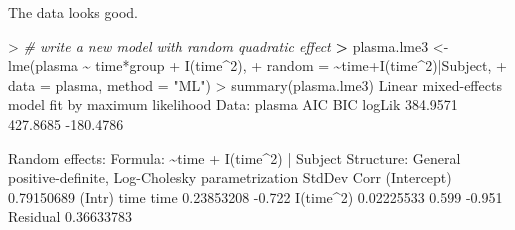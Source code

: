 \documentclass[
]{article}
\newenvironment{Shaded}{\begin{snugshade}}{\end{snugshade}}
\newcommand{\AttributeTok}[1]{\textcolor[rgb]{0.77,0.63,0.00}{#1}}
\newcommand{\CommentTok}[1]{\textcolor[rgb]{0.56,0.35,0.01}{\textit{#1}}}
\newcommand{\DecValTok}[1]{\textcolor[rgb]{0.00,0.00,0.81}{#1}}
\newcommand{\ErrorTok}[1]{\textcolor[rgb]{0.64,0.00,0.00}{\textbf{#1}}}
\newcommand{\FloatTok}[1]{\textcolor[rgb]{0.00,0.00,0.81}{#1}}
\newcommand{\FunctionTok}[1]{\textcolor[rgb]{0.00,0.00,0.00}{#1}}
\newcommand{\NormalTok}[1]{#1}
\newcommand{\OtherTok}[1]{\textcolor[rgb]{0.56,0.35,0.01}{#1}}
\newcommand{\SpecialCharTok}[1]{\textcolor[rgb]{0.00,0.00,0.00}{#1}}
\newcommand{\StringTok}[1]{\textcolor[rgb]{0.31,0.60,0.02}{#1}}
\begin{document}
The data looks good.

\begin{Shaded}
\begin{Highlighting}[]
\SpecialCharTok{\textgreater{}} \CommentTok{\# write a new model with random quadratic effect}
\ErrorTok{\textgreater{}}\NormalTok{ plasma.lme3 }\OtherTok{\textless{}{-}} \FunctionTok{lme}\NormalTok{(plasma }\SpecialCharTok{\textasciitilde{}}\NormalTok{ time}\SpecialCharTok{*}\NormalTok{group }\SpecialCharTok{+} \FunctionTok{I}\NormalTok{(time}\SpecialCharTok{\^{}}\DecValTok{2}\NormalTok{),}
\SpecialCharTok{+}                    \AttributeTok{random =} \SpecialCharTok{\textasciitilde{}}\NormalTok{time}\SpecialCharTok{+}\FunctionTok{I}\NormalTok{(time}\SpecialCharTok{\^{}}\DecValTok{2}\NormalTok{)}\SpecialCharTok{|}\NormalTok{Subject,}
\SpecialCharTok{+}                    \AttributeTok{data =}\NormalTok{ plasma, }\AttributeTok{method =} \StringTok{"ML"}\NormalTok{)}
\SpecialCharTok{\textgreater{}} \FunctionTok{summary}\NormalTok{(plasma.lme3)}
\NormalTok{Linear mixed}\SpecialCharTok{{-}}\NormalTok{effects model fit by maximum likelihood}
\NormalTok{  Data}\SpecialCharTok{:}\NormalTok{ plasma }
\NormalTok{       AIC      BIC    logLik}
  \FloatTok{384.9571} \FloatTok{427.8685} \SpecialCharTok{{-}}\FloatTok{180.4786}

\NormalTok{Random effects}\SpecialCharTok{:}
\NormalTok{ Formula}\SpecialCharTok{:} \ErrorTok{\textasciitilde{}}\NormalTok{time }\SpecialCharTok{+} \FunctionTok{I}\NormalTok{(time}\SpecialCharTok{\^{}}\DecValTok{2}\NormalTok{) }\SpecialCharTok{|}\NormalTok{ Subject}
\NormalTok{ Structure}\SpecialCharTok{:}\NormalTok{ General positive}\SpecialCharTok{{-}}\NormalTok{definite, Log}\SpecialCharTok{{-}}\NormalTok{Cholesky parametrization}
\NormalTok{            StdDev     Corr         }
\NormalTok{(Intercept) }\FloatTok{0.79150689}\NormalTok{ (Intr) time  }
\NormalTok{time        }\FloatTok{0.23853208} \SpecialCharTok{{-}}\FloatTok{0.722}       
\FunctionTok{I}\NormalTok{(time}\SpecialCharTok{\^{}}\DecValTok{2}\NormalTok{)   }\FloatTok{0.02225533}  \FloatTok{0.599} \SpecialCharTok{{-}}\FloatTok{0.951}
\NormalTok{Residual    }\FloatTok{0.36633783}              


\end{Highlighting}
\end{Shaded}
\end{document}
